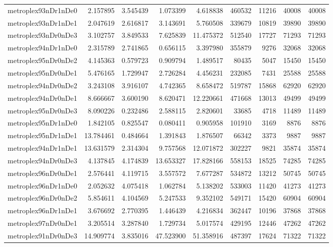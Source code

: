 \documentclass[../../../thesis.tex]{subfiles}
\begin{document}
\begin{longtable}{|l|r|r|r|r|r|r|r|r|}
metroplex93nDr1nDe0 & 2.157895 & 3.545439 & 1.073399 & 4.618838 & 460532 & 11216 & 40008 & 40008 \\
metroplex93nDr1nDe1 & 2.047619 & 2.616817 & 3.143691 & 5.760508 & 339679 & 10819 & 39890 & 39890 \\
metroplex93nDr0nDe3 & 3.102757 & 3.849533 & 7.625839 & 11.475372 & 512540 & 17727 & 71293 & 71293 \\
metroplex94nDr1nDe0 & 2.315789 & 2.741865 & 0.656115 & 3.397980 & 355879 & 9276 & 32068 & 32068 \\
metroplex95nDr0nDe2 & 4.145363 & 0.579723 & 0.909794 & 1.489517 & 80435 & 5047 & 15450 & 15450 \\
metroplex95nDr0nDe1 & 5.476165 & 1.729947 & 2.726284 & 4.456231 & 232085 & 7431 & 25588 & 25588 \\
metroplex94nDr0nDe2 & 3.243108 & 3.916107 & 4.742365 & 8.658472 & 519787 & 15868 & 62920 & 62920 \\
metroplex94nDr0nDe1 & 8.666667 & 3.600190 & 8.620471 & 12.220661 & 471668 & 13013 & 49499 & 49499 \\
metroplex95nDr0nDe3 & 8.090226 & 0.232486 & 2.588115 & 2.820601 & 33685 & 4718 & 11489 & 11489 \\
metroplex95nDr1nDe0 & 1.842105 & 0.825547 & 0.080411 & 0.905958 & 101910 & 3169 & 8876 & 8876 \\
metroplex95nDr1nDe1 & 13.784461 & 0.484664 & 1.391843 & 1.876507 & 66342 & 3373 & 9887 & 9887 \\
metroplex94nDr1nDe1 & 13.631579 & 2.314304 & 9.757568 & 12.071872 & 302227 & 9821 & 35874 & 35874 \\
metroplex94nDr0nDe3 & 4.137845 & 4.174839 & 13.653327 & 17.828166 & 558153 & 18525 & 74285 & 74285 \\
metroplex96nDr0nDe1 & 2.576441 & 4.119715 & 3.557572 & 7.677287 & 534872 & 13212 & 50745 & 50745 \\
metroplex96nDr1nDe0 & 2.052632 & 4.075418 & 1.062784 & 5.138202 & 533003 & 11420 & 41273 & 41273 \\
metroplex96nDr0nDe2 & 5.854611 & 4.104569 & 5.247533 & 9.352102 & 549171 & 15420 & 60904 & 60904 \\
metroplex96nDr1nDe1 & 3.676692 & 2.770395 & 1.446439 & 4.216834 & 362447 & 10196 & 37868 & 37868 \\
metroplex97nDr0nDe1 & 3.205514 & 3.287840 & 1.729734 & 5.017574 & 429195 & 12446 & 47262 & 47262 \\
metroplex91nDr0nDe3 & 14.909774 & 3.835016 & 47.523900 & 51.358916 & 487397 & 17624 & 71322 & 71322 \\

\end{longtable}
\end{document}
